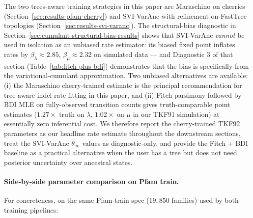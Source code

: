 The two trees-aware training strategies in this paper are
Maraschino on cherries (Section~\ref{sec:results-pfam-cherry})
and SVI-VarAnc with refinement on FastTree topologies
(Section~\ref{sec:results-svi-varanc}).  The structural-bias
diagnostic in Section~\ref{sec:cumulant-structural-bias-results}
shows that SVI-VarAnc \emph{cannot} be used in isolation as an
unbiased rate estimator: its biased fixed point inflates rates by
$\beta_\lambda \approx 2.85$, $\beta_\mu \approx 2.32$ on
simulated data --- and Diagnostic 3 of that section
(Table~\ref{tab:fitch-plus-bdi}) demonstrates that the bias is
specifically from the variational-cumulant approximation.  Two
unbiased alternatives are available: (i) the Maraschino
cherry-trained estimate is the principal recommendation for tree-aware
indel-rate fitting in this paper, and (ii) Fitch parsimony followed
by BDI MLE on fully-observed transition counts gives
truth-comparable point estimates ($1.27\times$ truth on $\lambda$,
$1.02\times$ on $\mu$ in our TKF91 simulation) at essentially zero
inferential cost.  We therefore report the cherry-trained TKF92
parameters as our headline rate estimate throughout the
downstream sections, treat the SVI-VarAnc $\theta_\infty$ values as
diagnostic-only, and provide the Fitch + BDI baseline as a
practical alternative when the user has a tree but does not need
posterior uncertainty over ancestral states.

\paragraph{Side-by-side parameter comparison on Pfam train.}
For concreteness, on the same Pfam-train spec ($19{,}850$
families) used by both training pipelines:

